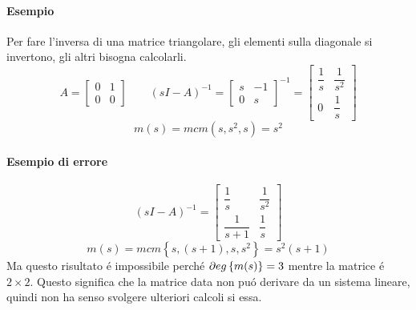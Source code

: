 \documentclass[../main.tex]{subfiles}
\begin{document}
		\begin{mdframed}[style=Esempio]
			\paragraph{Esempio}
			Per fare l'inversa di una matrice triangolare, gli elementi sulla diagonale si invertono, gli altri bisogna calcolarli.
			\[
				A =
				\begin{bmatrix}
					0 & 1\\
					0 & 0
				\end{bmatrix} \qquad (sI - A)^{-1} = 
				\begin{bmatrix}
					s & -1\\
					0 & s
				\end{bmatrix} ^{-1} =
				\begin{bmatrix}
					\dfrac{1}{s} & \dfrac{1}{s^2}
					\\[1em]
					0 & \dfrac{1}{s}
				\end{bmatrix}
			\]
			\[
				m(s) = mcm( s, s^2, s) = s^2
			\]
		\end{mdframed}

		\begin{mdframed}[style=Esempio]
			\paragraph{Esempio di errore}
			\[
				(sI-A)^{-1} =
				\begin{bmatrix}
					\dfrac{1}{s} & \dfrac{1}{s^2}
					\\[1em]
					\dfrac{1}{s+1} & \dfrac{1}{s}
				\end{bmatrix}
			\]
			\[
				m(s) = mcm \left\lbrace s, (s+1), s, s^2 \right\rbrace = s^2(s+1)
			\]
			Ma questo risultato \'e impossibile perch\'e $ \partial eg \left\lbrace m(s) \right\rbrace = 3 $ mentre la matrice \'e $ 2 \times 2 $. Questo significa che la matrice data non pu\'o derivare da un sistema lineare, quindi non ha senso svolgere ulteriori calcoli si essa.
		\end{mdframed}
\end{document}
